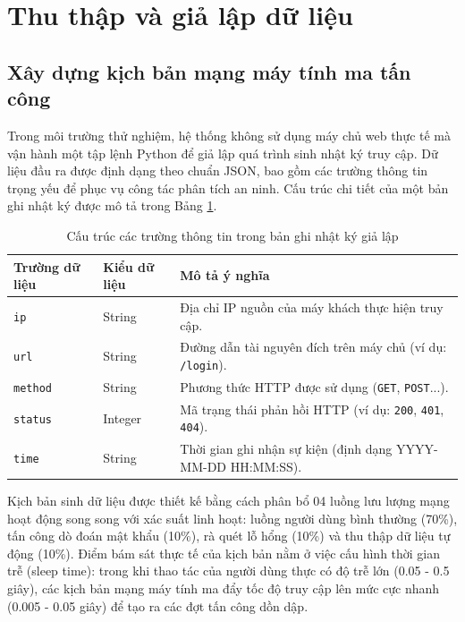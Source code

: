 \documentclass[12pt,a4paper]{report}
\begin{document}
\section{Thu thập và giả lập dữ liệu}
\subsection{Xây dựng kịch bản mạng máy tính ma tấn công}
Trong môi trường thử nghiệm, hệ thống không sử dụng máy chủ web thực tế mà vận hành một tập lệnh Python để giả lập quá trình sinh nhật ký truy cập. Dữ liệu đầu ra được định dạng theo chuẩn JSON, bao gồm các trường thông tin trọng yếu để phục vụ công tác phân tích an ninh. Cấu trúc chi tiết của một bản ghi nhật ký được mô tả trong Bảng \ref{tab:log_schema}.

\begin{table}[htbp]
    \centering
    \renewcommand{\arraystretch}{1.3}
    \begin{tabular}{|l|l|p{8cm}|}
        \hline
        \textbf{Trường dữ liệu} & \textbf{Kiểu dữ liệu} & \textbf{Mô tả ý nghĩa} \\
        \hline
        \texttt{ip} & String & Địa chỉ IP nguồn của máy khách thực hiện truy cập. \\
        \hline
        \texttt{url} & String & Đường dẫn tài nguyên đích trên máy chủ (ví dụ: \texttt{/login}). \\
        \hline
        \texttt{method} & String & Phương thức HTTP được sử dụng (\texttt{GET}, \texttt{POST}...). \\
        \hline
        \texttt{status} & Integer & Mã trạng thái phản hồi HTTP (ví dụ: \texttt{200}, \texttt{401}, \texttt{404}). \\
        \hline
        \texttt{time} & String & Thời gian ghi nhận sự kiện (định dạng YYYY-MM-DD HH:MM:SS). \\
        \hline
    \end{tabular}
    \caption{Cấu trúc các trường thông tin trong bản ghi nhật ký giả lập}
    \label{tab:log_schema}
\end{table}

Kịch bản sinh dữ liệu được thiết kế bằng cách phân bổ 04 luồng lưu lượng mạng hoạt động song song với xác suất linh hoạt: luồng người dùng bình thường (70\%), tấn công dò đoán mật khẩu (10\%), rà quét lỗ hổng (10\%) và thu thập dữ liệu tự động (10\%). Điểm bám sát thực tế của kịch bản nằm ở việc cấu hình thời gian trễ (sleep time): trong khi thao tác của người dùng thực có độ trễ lớn (0.05 - 0.5 giây), các kịch bản mạng máy tính ma đẩy tốc độ truy cập lên mức cực nhanh (0.005 - 0.05 giây) để tạo ra các đợt tấn công dồn dập. 
\end{document}
